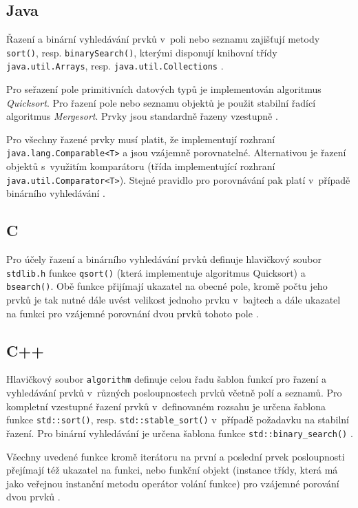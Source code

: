 \documentclass[czech,BP]{thesiskiv}
\begin{document}
\subsection{Java}
Řazení a binární vyhledávání prvků v~poli nebo seznamu zajišťují metody \texttt{sort()}, resp. \texttt{binarySearch()}, kterými disponují knihovní třídy \texttt{java.util\-.Arrays}, resp. \texttt{java.util.Collections} \cite{java-guide-arrays, java-guide-collections}.\par
Pro seřazení pole primitivních datových typů je implementován algoritmus \textit{Quicksort}. Pro řazení pole nebo seznamu objektů je použit stabilní řadící algoritmus \textit{Mergesort}. Prvky jsou standardně řazeny vzestupně \cite{java-guide-arrays, java-guide-collections}.\par
Pro všechny řazené prvky musí platit, že implementují rozhraní \texttt{java\-.lang.Comparable<T>} a jsou vzájemně porovnatelné. Alternativou je řazení objektů s~využitím komparátoru (třída implementující rozhraní \texttt{java.util\-.Comparator<T>}). Stejné pravidlo pro porovnávání pak platí v~případě binárního vyhledávání \cite{java-guide-arrays, java-guide-collections, java-guide-comparable, java-guide-comparator}.\par

\subsection{C}
Pro účely řazení a binárního vyhledávání prvků definuje hlavičkový soubor \texttt{stdlib.h} funkce \texttt{qsort()} (která implementuje algoritmus Quicksort) a \texttt{bsearch()}. Obě funkce přijímají ukazatel na obecné pole, kromě počtu jeho prvků je tak nutné dále uvést velikost jednoho prvku v~bajtech a dále ukazatel na funkci pro vzájemné porovnání dvou prvků tohoto pole \cite{cpp-guide-qsort, cpp-guide-bsearch}.

\subsection{C++}
Hlavičkový soubor \texttt{algorithm} definuje celou řadu šablon funkcí pro řazení a vyhledávání prvků v~různých posloupnostech prvků včetně polí a seznamů. Pro kompletní vzestupné řazení prvků v~definovaném rozsahu je určena šablona funkce \texttt{std::sort()}, resp. \texttt{std::stable\_sort()} v~případě požadavku na stabilní řazení. Pro binární vyhledávání je určena šablona funkce \newline\texttt{std::binary\_search()} \cite{cpp-guide-stdsort, cpp-guide-stdstablesort, cpp-guide-stdbinarysearch}.\par
Všechny uvedené funkce kromě iterátoru na první a poslední prvek posloupnosti přejímají též ukazatel na funkci, nebo funkční objekt (instance třídy, která má jako veřejnou instanční metodu operátor volání funkce) pro vzájemné porování dvou prvků \cite{cpp-guide-stdsort, cpp-guide-stdstablesort, cpp-guide-stdbinarysearch}.
\end{document}
